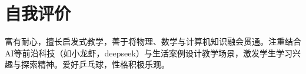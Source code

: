 \documentclass[letterpaper,11pt]{article}
\begin{document}
\section{自我评价}
\begin{itemize}[leftmargin=0.15in, label={}]
        {
        \item{
                富有耐心，擅长启发式教学，善于将物理、数学与计算机知识融会贯通。注重结合AI等前沿科技（如小龙虾，deepseek）与生活案例设计教学场景，激发学生学习兴趣与探索精神。爱好乒乓球，性格积极乐观。
        }}
\end{itemize}
\end{document}
